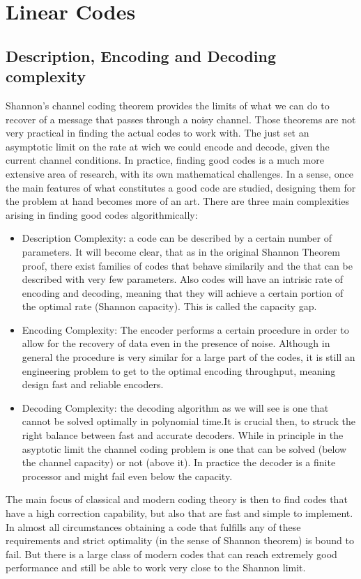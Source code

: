 \chapter{Linear Codes}
\section{Description, Encoding and Decoding complexity}
Shannon's channel coding theorem provides the limits of what we can do to recover of a message that passes through a noisy channel. Those theorems are not very practical in finding the actual codes to work with. The just set an asymptotic limit on the rate at wich we could encode and decode, given the current channel conditions. In practice, finding good codes is a much more extensive area of research, with its own mathematical challenges. In a sense, once the main features of what constitutes a good code are studied, designing them for the problem at hand becomes more of an art. There are three main complexities arising in finding good codes algorithmically:
\begin{itemize}
	\item Description Complexity: a code can be described by a certain number of parameters. It will become clear, that as in the original Shannon Theorem proof, there exist families of codes that behave similarily and the that can be described with very few parameters. Also codes will have an intrisic rate of encoding and decoding, meaning that they will achieve a certain portion of the optimal rate (Shannon capacity). This is called the capacity gap.
	\item Encoding Complexity: The encoder performs a certain procedure in order to allow for the recovery of data even in the presence of noise. Although in general the procedure is very similar for a large part of the codes, it is still an engineering problem to get to the optimal encoding throughput, meaning design fast and reliable encoders.
	\item Decoding Complexity: the decoding algorithm as we will see is one that cannot be solved optimally in polynomial time.It is crucial then, to struck the right balance between fast and accurate decoders. While in principle in the asyptotic limit the channel coding problem is one that can be solved (below the channel capacity) or not (above it). In practice the decoder is a finite processor and might fail even below the capacity.
\end{itemize}

The main focus of classical and modern coding theory is then to find codes that have a high correction capability, but also that are fast and simple to implement. In almost all circumstances obtaining a code that fulfills any of these requirements and strict optimality (in the sense of Shannon theorem) is bound to fail. But there is a large class of modern codes that can reach extremely good performance and still be able to work very close to the Shannon limit.

